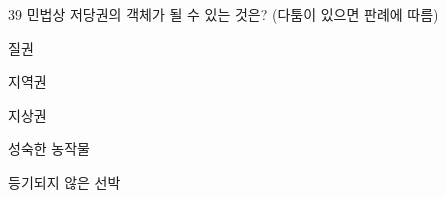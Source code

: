 \begin{question}{39}
민법상 저당권의 객체가 될 수 있는 것은? (다툼이 있으면 판례에 따름)
\begin{choices}
  \item 질권
  \item 지역권
  \item 지상권
  \item 성숙한 농작물
  \item 등기되지 않은 선박
\end{choices}
\end{question}
